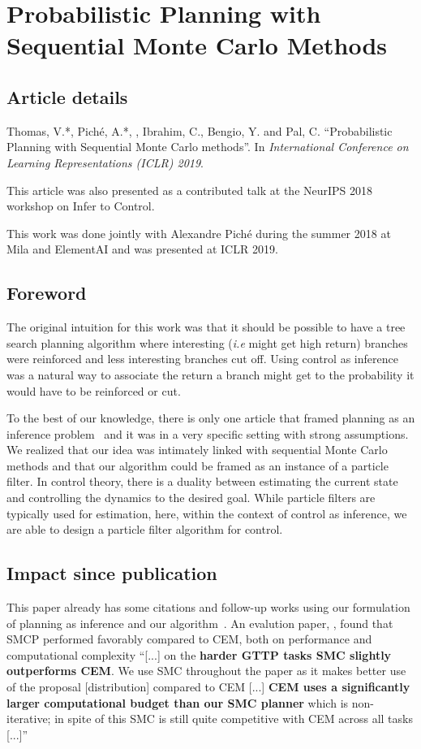 \chapter{Probabilistic Planning with Sequential Monte Carlo Methods}
\label{chapter:smcp}
\section*{Article details}


Thomas, V.*, Piché, A.*, , Ibrahim, C., Bengio, Y. and Pal, C. ``Probabilistic Planning with Sequential Monte Carlo methods''. In \emph{International Conference on Learning Representations (ICLR) 2019}.

This article was also presented as a contributed talk at the NeurIPS 2018 workshop on Infer to Control.

This work was done jointly with Alexandre Pich\'{e} during the summer 2018 at Mila and ElementAI and was presented at ICLR 2019. 
\section*{Foreword}
The original intuition for this work  was that it should be possible to have a tree search planning algorithm where interesting (\emph{i.e} might get high return) branches were reinforced and less interesting branches cut off. Using control as inference was a natural way to associate the return a branch might get to the probability it would have to be reinforced or cut.

To the best of our knowledge, there is only one article that framed planning as an inference problem~\citep{attias2003planning} and it was in a very specific setting with strong assumptions.
We realized that our idea was intimately linked with sequential Monte Carlo methods and that our algorithm could be framed as an instance of a particle filter.
In control theory, there is a duality between estimating the current state and controlling the dynamics to the desired goal. While particle filters are typically used for estimation, here, within the context of control as inference, we are able to design a particle filter algorithm for control.


\section*{Impact since publication}
This paper already has some citations and follow-up works using our formulation of planning as inference and our algorithm~\citep{wang2019dual, lioutas2022critic}. An evalution paper, \citep{byravan22eval}, found that SMCP performed favorably compared to CEM, both on performance and computational complexity
        ``[...] on the \textbf{harder GTTP tasks SMC slightly outperforms CEM}. We use SMC throughout the paper as it makes better use of the proposal [distribution] compared to CEM 
        [...]
        \textbf{CEM uses a significantly larger computational budget than our SMC planner} which is non-iterative; in spite of this SMC is still quite competitive with CEM across all tasks [...]''

